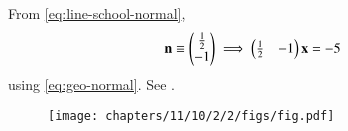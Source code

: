 			From \eqref{eq:line-school-normal},
\begin{align}
\mathbf{n}\equiv \begin{pmatrix}\frac{1}{2}\\ -1\end{pmatrix}
\implies \begin{pmatrix}\frac{1}{2}&-1\end{pmatrix}{\mathbf{x}}&=-5
\end{align}
using \eqref{eq:geo-normal}.
See 
		.
\begin{figure}[H]
\centering
\texttt{[image: chapters/11/10/2/2/figs/fig.pdf]}
\caption{}
		\label{fig:chapters/11/10/2/2/Figure}
\end{figure}
